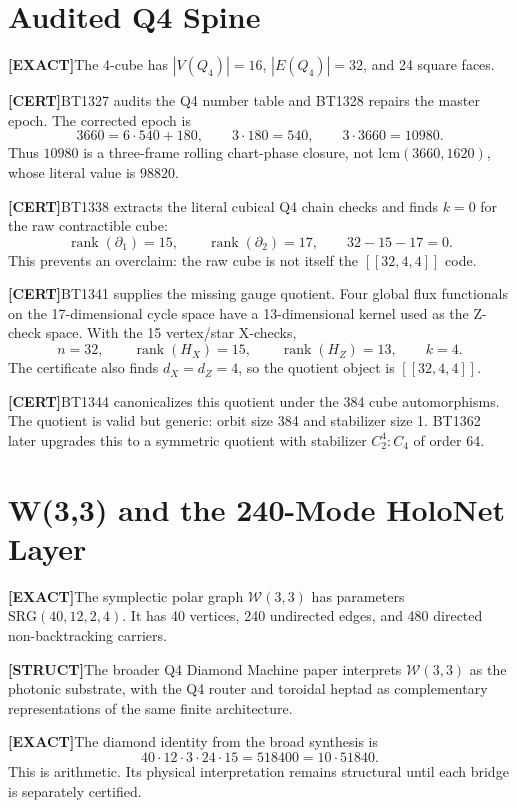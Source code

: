 \documentclass[11pt]{article}
\newcommand{\Qfour}{Q_4}
\newcommand{\W}{\mathcal W(3,3)}
\newcommand{\claim}[2]{\noindent\textbf{[#1]}\;#2}
\begin{document}
\section{Audited Q4 Spine}

\claim{EXACT}{The 4-cube has \(|V(\Qfour)|=16\), \(|E(\Qfour)|=32\), and 24 square faces.}

\claim{CERT}{BT1327 audits the Q4 number table and BT1328 repairs the master epoch. The corrected epoch is}
\[
3660=6\cdot540+180,\qquad 3\cdot180=540,\qquad 3\cdot3660=10980.
\]
Thus \(10980\) is a three-frame rolling chart-phase closure, not \(\mathrm{lcm}(3660,1620)\), whose literal value is \(98820\).

\claim{CERT}{BT1338 extracts the literal cubical Q4 chain checks and finds \(k=0\) for the raw contractible cube:}
\[
\operatorname{rank}(\partial_1)=15,\qquad \operatorname{rank}(\partial_2)=17,
\qquad 32-15-17=0.
\]
This prevents an overclaim: the raw cube is not itself the \([[32,4,4]]\) code.

\claim{CERT}{BT1341 supplies the missing gauge quotient. Four global flux functionals on the 17-dimensional cycle space have a 13-dimensional kernel used as the Z-check space. With the 15 vertex/star X-checks,}
\[
 n=32,
 \qquad \operatorname{rank}(H_X)=15,
 \qquad \operatorname{rank}(H_Z)=13,
 \qquad k=4.
\]
The certificate also finds \(d_X=d_Z=4\), so the quotient object is \([[32,4,4]]\).

\claim{CERT}{BT1344 canonicalizes this quotient under the 384 cube automorphisms. The quotient is valid but generic: orbit size 384 and stabilizer size 1. BT1362 later upgrades this to a symmetric quotient with stabilizer \(C_2^4:C_4\) of order 64.}

\section{W(3,3) and the 240-Mode HoloNet Layer}

\claim{EXACT}{The symplectic polar graph \(\W\) has parameters \(\mathrm{SRG}(40,12,2,4)\). It has 40 vertices, 240 undirected edges, and 480 directed non-backtracking carriers.}

\claim{STRUCT}{The broader Q4 Diamond Machine paper interprets \(\W\) as the photonic substrate, with the Q4 router and toroidal heptad as complementary representations of the same finite architecture.}

\claim{EXACT}{The diamond identity from the broad synthesis is}
\[
40\cdot12\cdot3\cdot24\cdot15=518400=10\cdot 51840.
\]
This is arithmetic. Its physical interpretation remains structural until each bridge is separately certified.
\end{document}
